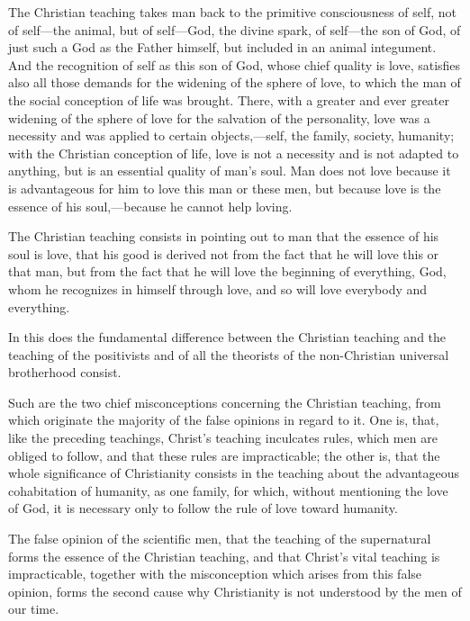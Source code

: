 \documentclass{book}
\begin{document}
The Christian teaching takes man back to the primitive consciousness of self, not of self—the animal, but of self—God, the divine spark, of self—the son of God, of just such a God as the Father himself, but included in an animal integument. And the recognition of self as this son of God, whose chief quality is love, satisfies also all those demands for the widening of the sphere of love, to which the man of the social conception of life was brought. There, with a greater and ever greater widening of the sphere of love for the salvation of the personality, love was a necessity and was applied to certain objects,—self, the family, society, humanity; with the Christian conception of life, love is not a necessity and is not adapted to anything, but is an essential quality of man’s soul. Man does not love because it is advantageous for him to love this man or these men, but because love is the essence of his soul,—because he cannot help loving.

The Christian teaching consists in pointing out to man that the essence of his soul is love, that his good is derived not from the fact that he will love this or that man, but from the fact that he will love the beginning of everything, God, whom he recognizes in himself through love, and so will love everybody and everything.

In this does the fundamental difference between the Christian teaching and the teaching of the positivists and of all the theorists of the non-Christian universal brotherhood consist.

Such are the two chief misconceptions concerning the Christian teaching, from which originate the majority of the false opinions in regard to it. One is, that, like the preceding teachings, Christ’s teaching inculcates rules, which men are obliged to follow, and that these rules are impracticable; the other is, that the whole significance of Christianity consists in the teaching about the advantageous cohabitation of humanity, as one family, for which, without mentioning the love of God, it is necessary only to follow the rule of love toward humanity.

The false opinion of the scientific men, that the teaching of the supernatural forms the essence of the Christian teaching, and that Christ’s vital teaching is impracticable, together with the misconception which arises from this false opinion, forms the second cause why Christianity is not understood by the men of our time.
\end{document}
